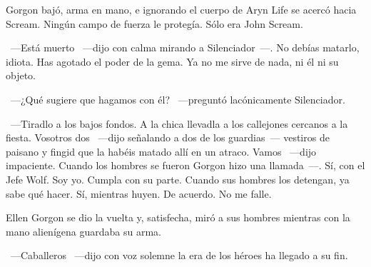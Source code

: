 Gorgon bajó, arma en mano, e ignorando el cuerpo de Aryn Life se acercó hacia Scream. Ningún campo de fuerza le protegía. Sólo era John Scream.

~---Está muerto ~---dijo con calma mirando a Silenciador~---. No debías matarlo, idiota. Has agotado el poder de la gema. Ya no me sirve de nada, ni él ni su objeto.

~---¿Qué sugiere que hagamos con él? ~---preguntó lacónicamente Silenciador.

~---Tiradlo a los bajos fondos. A la chica llevadla a los callejones cercanos a la fiesta. Vosotros dos ~---dijo señalando a dos de los guardias~--- vestiros de paisano y fingid que la habéis matado allí en un atraco. Vamos ~---dijo impaciente. Cuando los hombres se fueron Gorgon hizo una llamada~---. Sí, con el Jefe Wolf. Soy yo. Cumpla con su parte. Cuando sus hombres los detengan, ya sabe qué hacer. Sí, mientras huyen. De acuerdo. No me falle.

Ellen Gorgon se dio la vuelta y, satisfecha, miró a sus hombres mientras con la mano alienígena guardaba su arma.

~---Caballeros ~---dijo con voz solemne\typo{~---}{~---,} la era de los héroes ha llegado a su fin.

\endinput
